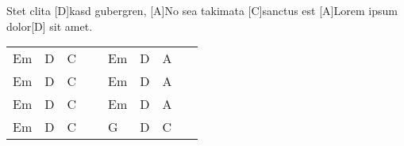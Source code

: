 \vspace{-2.875em} \hfill {}
\vspace{-0.125em} 
	
\begin{guitar}
	[A]Stet clita [D]kasd gubergren, 
	[A]No sea takimata [C]sanctus est 
	[A]Lorem ipsum dolor[D] sit amet.
	
	{\footnotesize\begin{tabular}{|ll|ll|ll|ll|}
			Em & D & C & ~ & Em & D & A & ~ \\
			Em & D & C & ~ & Em & D & A & ~ \\
			Em & D & C & ~ & Em & D & A & ~ \\
			Em & D & C & ~ & G & D & C & ~
	\end{tabular}} 
	
	\begin{highlightbar}
		 
	\end{highlightbar}
\end{guitar}